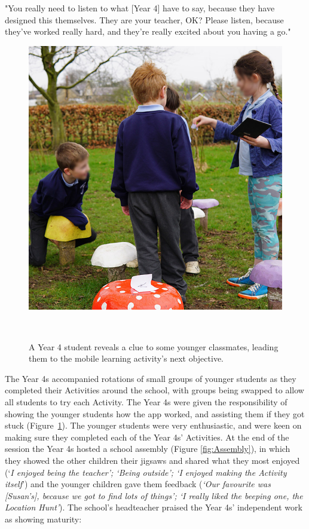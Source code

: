 \begin{displayquote}
"You really need to listen to what [Year 4] have to say, because they have designed this themselves. They are your teacher, OK? Please listen, because they've worked really hard, and they're really excited about you having a go."
\end{displayquote}

\begin{figure}
\centering
  \includegraphics[width=0.66\columnwidth]{images/chapter08/mushrooms.jpg}
  \caption[Year 4 students using OurPlace]{A Year 4 student reveals a clue to some younger classmates, leading them to the mobile learning activity's next objective. }~\label{fig:Mushrooms}
\end{figure}

The Year 4s accompanied rotations of small groups of younger students as they completed their Activities around the school, with groups being swapped to allow all students to try each Activity. The Year 4s were given the responsibility of showing the younger students how the app worked, and assisting them if they got stuck (Figure~\ref{fig:Mushrooms}). The younger students were very enthusiastic, and were keen on making sure they completed each of the Year 4s' Activities. At the end of the session the Year 4s hosted a school assembly (Figure \ref{fig:Assembly}), in which they showed the other children their jigsaws and shared what they most enjoyed (`\textit{I enjoyed being the teacher'; `Being outside'; `I enjoyed making the Activity itself}') and the younger children gave them feedback (\textit{`Our favourite was [Susan's], because we got to find lots of things'; `I really liked the beeping one, the Location Hunt'}). The school's headteacher praised the Year 4s' independent work as showing maturity: 

